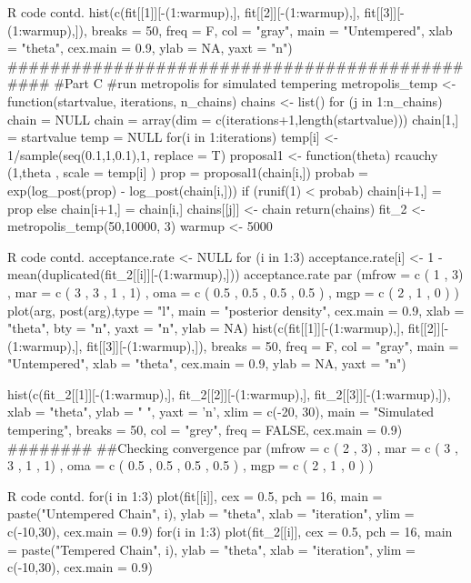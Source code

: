 \documentclass{article}
\begin{document}
\begin{sexylisting}{R code contd.}
hist(c(fit[[1]][-(1:warmup),], fit[[2]][-(1:warmup),], 
          fit[[3]][-(1:warmup),]), breaks = 50, freq = F,
     col = "gray",
     main = "Untempered",
     xlab = "theta",
     cex.main = 0.9, ylab = NA, yaxt = "n")
###############################################
#Part C
#run metropolis for simulated tempering
metropolis_temp <- function(startvalue, iterations, n_chains){
  chains <- list()
  for (j in 1:n_chains){
    chain = NULL
    chain = array(dim = c(iterations+1,length(startvalue)))
    chain[1,] = startvalue
    temp  = NULL
    for(i in 1:iterations){
      temp[i] <- 1/sample(seq(0.1,1,0.1),1, replace = T)
      proposal1 <- function(theta) {
      rcauchy (1,theta ,
                scale = temp[i] )
      }
      prop = proposal1(chain[i,])
      probab = exp(log_post(prop) - log_post(chain[i,]))
      if (runif(1) < probab){
        chain[i+1,] = prop
      }else{
        chain[i+1,] = chain[i,]
      }
      chains[[j]] <- chain
    }
  }
  return(chains)
}
fit_2 <- metropolis_temp(50,10000, 3)
warmup <- 5000
\end{sexylisting}
\begin{sexylisting}{R code contd.}
acceptance.rate <- NULL
for (i in 1:3){
  acceptance.rate[i] <- 1 - mean(duplicated(fit_2[[i]][-(1:warmup),]))
}
acceptance.rate
par (mfrow = c ( 1 , 3) ,
     mar = c ( 3 , 3 , 1 , 1) ,
     oma = c ( 0.5 , 0.5 , 0.5 , 0.5 ) ,
     mgp = c ( 2 , 1 , 0 ) )
plot(arg, post(arg),type = "l", 
     main = "posterior density",
     cex.main = 0.9,
     xlab = "theta",
     bty = "n",
     yaxt = "n",
     ylab = NA)
hist(c(fit[[1]][-(1:warmup),], fit[[2]][-(1:warmup),], 
       fit[[3]][-(1:warmup),]), breaks = 50, freq = F,
     col = "gray",
     main = "Untempered",
     xlab = "theta",
     cex.main = 0.9, ylab = NA, yaxt = "n")

hist(c(fit_2[[1]][-(1:warmup),],
       fit_2[[2]][-(1:warmup),],
       fit_2[[3]][-(1:warmup),]),
     xlab = "theta",
     ylab = " ",
     yaxt = 'n',
     xlim = c(-20, 30),
     main = "Simulated tempering",
     breaks = 50,
     col = "grey",
     freq = FALSE,
     cex.main = 0.9)
########
##Checking convergence
par (mfrow = c ( 2 , 3) ,
     mar = c ( 3 , 3 , 1 , 1) ,
     oma = c ( 0.5 , 0.5 , 0.5 , 0.5 ) ,
     mgp = c ( 2 , 1 , 0 ) )
     \end{sexylisting}
\begin{sexylisting}{R code contd.}
for(i in 1:3){
  plot(fit[[i]],
       cex = 0.5,
       pch = 16,
       main = paste("Untempered Chain", i),
       ylab = "theta",
       xlab = "iteration",
       ylim = c(-10,30),
       cex.main = 0.9)
       }
for(i in 1:3){
  plot(fit_2[[i]],
       cex = 0.5,
       pch = 16,
       main = paste("Tempered Chain", i),
       ylab = "theta",
       xlab = "iteration",
       ylim = c(-10,30),
       cex.main = 0.9)
}

\end{sexylisting}
\end{document}
